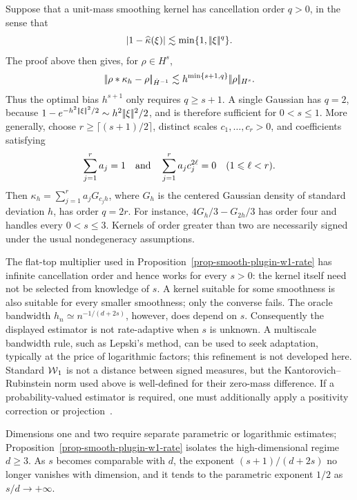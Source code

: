 \begin{rem}\label{rem-smooth-plugin-kernel-order}
	Suppose that a unit-mass smoothing kernel has cancellation order \(q>0\), in the sense that
	\[
		\left\lvert1-\widehat\kappa(\xi)\right\rvert
		\lesssim
		\min\{1,|\!| \xi |\!|^q\}.
	\]
	The proof above then gives, for \(\rho\in H^s\),
	\[
		|\!| \rho\ast\kappa_h-\rho |\!|_{\dot H^{-1}}
		\lesssim
		h^{\min\{s+1,q\}}|\!| \rho |\!|_{H^s}.
	\]
	Thus the optimal bias \(h^{s+1}\) only requires \(q\geq s+1\). A single Gaussian has \(q=2\), because \(1-e^{-h^2|\!| \xi |\!|^2/2}\sim h^2|\!| \xi |\!|^2/2\), and is therefore sufficient for \(0<s\leq1\). More generally, choose \(r\geq\lceil(s+1)/2\rceil\), distinct scales \(c_1,\ldots,c_r>0\), and coefficients satisfying
	\[
		\sum_{j=1}^r a_j=1
		\quad \text{and} \quad
		\sum_{j=1}^r a_jc_j^{2\ell}=0
		\quad (1\leqslant\ell<r).
	\]
	Then \(\kappa_h=\sum_{j=1}^r a_jG_{c_jh}\), where \(G_h\) is the centered Gaussian density of standard deviation \(h\), has order \(q=2r\). For instance, \(4G_h/3-G_{2h}/3\) has order four and handles every \(0<s\leq3\). Kernels of order greater than two are necessarily signed under the usual nondegeneracy assumptions.

	The flat-top multiplier used in Proposition~\ref{prop-smooth-plugin-w1-rate} has infinite cancellation order and hence works for every \(s>0\): the kernel itself need not be selected from knowledge of \(s\). A kernel suitable for some smoothness is also suitable for every smaller smoothness; only the converse fails. The oracle bandwidth \(h_n\simeq n^{-1/(d+2s)}\), however, does depend on \(s\). Consequently the displayed estimator is not rate-adaptive when \(s\) is unknown. A multiscale bandwidth rule, such as Lepski's method, can be used to seek adaptation, typically at the price of logarithmic factors; this refinement is not developed here. Standard \(\operatorname{\mathcal{W}}_1\) is not a distance between signed measures, but the Kantorovich--Rubinstein norm used above is well-defined for their zero-mass difference. If a probability-valued estimator is required, one must additionally apply a positivity correction or projection~\cite{nilesweed2019minimaxSmooth,divol2022measure}.
\end{rem}

Dimensions one and two require separate parametric or logarithmic estimates; Proposition~\ref{prop-smooth-plugin-w1-rate} isolates the high-dimensional regime \(d\geq3\). As \(s\) becomes comparable with \(d\), the exponent \((s+1)/(d+2s)\) no longer vanishes with dimension, and it tends to the parametric exponent \(1/2\) as \(s/d\to+\infty\).

